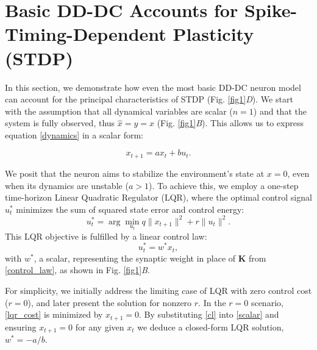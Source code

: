 \documentclass[9pt,twocolumn,twoside]{pnas-new}
\begin{document}

\section*{Basic DD-DC Accounts for Spike-Timing-Dependent Plasticity (STDP)}

In this section, we demonstrate how even the most basic DD-DC neuron model can account for the principal characteristics of STDP (Fig. \ref{fig1}{\it D}). We start with the assumption that all dynamical variables are scalar ($n=1$) and that the system is fully observed, thus $\hat{x}=y=x$ (Fig. \ref{fig1}{\it B}). This allows us to express equation \eqref{dynamics} in a scalar form:

\begin{equation}
\label{scalar}
x_{t+1}=ax_t+bu_t.
\end{equation}

We posit that the neuron aims to stabilize the environment's state at $x=0$, even when its dynamics are unstable ($a>1$). To achieve this, we employ a one-step time-horizon Linear Quadratic Regulator (LQR), where the optimal control signal $u^*_t$ minimizes the sum of squared state error and control energy:
\begin{equation}
\label{lqr_cost}
u^*_t=\arg\min_{u_t} q \|x_{t+1}\|^2 + r \|u_t\|^2.
\end{equation}
This LQR objective is fulfilled by a linear control law:
\begin{equation}
\label{cl}
u^*_t=w^*x_t,
\end{equation}
with $w^*$, a scalar, representing the synaptic weight in place of $\mathbf{K}$ from \eqref{control_law}, as shown in Fig. \ref{fig1}{\it B}.

For simplicity, we initially address the limiting case of LQR with zero control cost ($r=0$), and later present the solution for nonzero $r$. In the $r=0$ scenario, \eqref{lqr_cost} is minimized by $x_{t+1}=0$. By substituting \eqref{cl} into \eqref{scalar} and ensuring $x_{t+1}=0$ for any given $x_t$ we deduce a closed-form LQR solution, $w^*=-a/b$.
\end{document}
